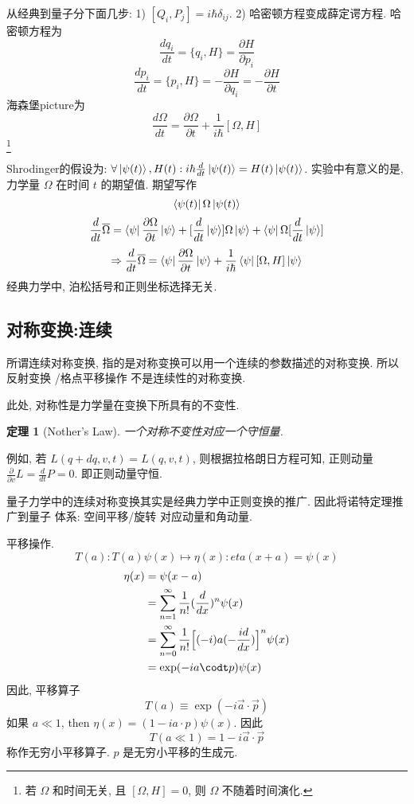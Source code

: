 \documentclass{ctexart}
\newtheorem{theorem}{定理}[section]
\begin{document}
从经典到量子分下面几步: 
1) $[Q_i, P_j]=i\hbar\delta_{ij}$. 
2) 哈密顿方程变成薛定谔方程. 哈密顿方程为 
\[
    \frac{dq_i}{dt} = \{q_i, H\} = \frac{\partial H}{\partial p_i}
\]
\[
    \frac{dp_i}{dt} = \{p_i,H\} = -\frac{\partial H}{\partial q_i} = -
    \frac{\partial H}{\partial t}
\]
海森堡picture为 
\[
\frac{d\Omega}{dt} = \frac{\partial \Omega}{\partial t} + \frac{1}{i\hbar }
[\Omega, H]
\]
\footnote{若 $\Omega$ 和时间无关, 且 $[\Omega,H]=0$, 则 $\Omega$ 不随着时间演化.}

Shrodinger的假设为: $\forall \ket{\psi(t)}, H(t): i\hbar \frac{d}{dt}
\ket{\psi(t)} = H(t)\ket{\psi(t)}$. 
实验中有意义的是, 力学量 $\Omega$ 在时间 $t$ 的期望值. 期望写作 
\[
    \bra{\psi(t)}\Omega\ket{\psi(t)} 
\]
\[
\frac{d}{dt}\overline{\Omega} = \bra{\psi}\frac{\partial \Omega}{\partial t}
\ket{\psi} 
+ [\frac{d}{dt}\ket{\psi}]\Omega\ket{\psi} 
+ \bra{\psi}\Omega[\frac{d}{dt}\ket{\psi}]
\]
\[
\Rightarrow \frac{d}{dt}\overline{\Omega} = \bra{\psi}\frac{\partial\Omega}
{\partial t} \ket{\psi} + \frac{1}{i\hbar }\bra{\psi}[\Omega, H] \ket{\psi} 
\]
经典力学中, 泊松括号和正则坐标选择无关. 

\subsection{对称变换:连续} 

所谓连续对称变换, 指的是对称变换可以用一个连续的参数描述的对称变换. 所以反射变换
/格点平移操作 不是连续性的对称变换. 

此处, 对称性是力学量在变换下所具有的不变性. 

\begin{theorem}[Nother's Law]
    一个对称不变性对应一个守恒量. 
\end{theorem}

例如, 若 $L(q+dq, v, t)= L(q,v,t)$, 则根据拉格朗日方程可知, 正则动量
$\frac{\partial}{\partial v}L=\frac{d}{dt}P=0$. 即正则动量守恒. 

量子力学中的连续对称变换其实是经典力学中正则变换的推广. 因此将诺特定理推广到量子
体系: 空间平移/旋转 对应动量和角动量. 

平移操作. 
\[
T(a): T(a)\psi(x) \mapsto \eta(x): eta(x+a) = \psi(x)
\]
\[
\begin{align} 
    \eta(x) &= \psi(x-a) \\
	    &= \sum_{n=1}^{\infty} \frac{1}{n!} (\frac{d}{dx})^n \psi(x) \\
	    &= \sum_{n=0}^{\infty}\frac{1}{n!}\Bigl[ (-i) a(-\frac{id}{dx})\Bigr]
	    ^n\psi(x) \\
	    &= \exp(-ia\codt p) \psi(x) 
\end{align}
\]
因此, 平移算子
 \[
T(a) \equiv \exp(-i \vec{a}\cdot \vec{p}) 
\]
如果 $a \ll 1$, then $\eta(x)=(1 - ia\cdot p)\psi(x)$. 因此 
\[
T(a\ll 1) = 1 - i \vec{a}\cdot \vec{p} 
\]
称作无穷小平移算子. $p$ 是无穷小平移的生成元. 
\end{document}
